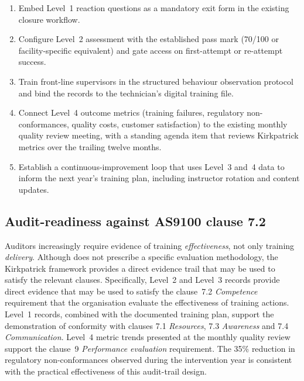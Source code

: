 \begin{enumerate}
  \item Embed Level~1 reaction questions as a mandatory exit form in the
        existing \LMS{} closure workflow.
  \item Configure Level~2 assessment with the established pass mark
        (70/100 or facility-specific equivalent) and gate \ERP{} access on
        first-attempt or re-attempt success.
  \item Train front-line supervisors in the structured behaviour
        observation protocol and bind the records to the technician's
        digital training file.
  \item Connect Level~4 outcome metrics (training failures, regulatory
        non-conformances, quality costs, customer satisfaction) to the
        existing monthly quality review meeting, with a standing agenda
        item that reviews Kirkpatrick metrics over the trailing twelve
        months.
  \item Establish a continuous-improvement loop that uses Level~3 and~4
        data to inform the next year's training plan, including instructor
        rotation and content updates.
\end{enumerate}

\subsection{Audit-readiness against AS9100 clause 7.2}
\label{subsec:mgr-audit}

Auditors increasingly require evidence of training \textit{effectiveness},
not only training \textit{delivery}. Although \AS{} does not prescribe a
specific evaluation methodology, the Kirkpatrick framework provides a
direct evidence trail that may be used to satisfy the relevant clauses.
Specifically, Level~2 and Level~3 records provide direct evidence that
may be used to satisfy the clause~7.2 \textit{Competence} requirement that
the organisation evaluate the effectiveness of training actions. Level~1
records, combined with the documented training plan, support the
demonstration of conformity with clauses 7.1 \textit{Resources}, 7.3
\textit{Awareness} and 7.4 \textit{Communication}. Level~4 metric
trends presented at the monthly quality review support the clause~9
\textit{Performance evaluation} requirement. The 35\% reduction in
regulatory non-conformances observed during the intervention year is
consistent with the practical effectiveness of this audit-trail design.

